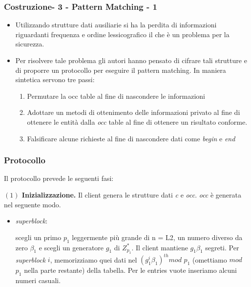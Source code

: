 \documentclass{beamer}
\begin{document}
\begin{frame}
\frametitle{Costruzione- 3 - Pattern Matching - 1}
\begin{itemize}
	\item Utilizzando strutture dati ausiliarie si ha la perdita di informazioni riguardanti frequenza e ordine lessicografico il che è un problema per la sicurezza.\pause
	\item Per risolvere tale problema gli autori hanno pensato di cifrare tali strutture e di proporre un protocollo per eseguire il pattern matching. In maniera sintetica servono tre passi:\pause
	\begin{enumerate}
		\item Permutare la occ table al fine di nascondere le informazioni
		\item Adottare un metodi di ottenimento delle informazioni privato al fine di ottenere le entità dalla \textit{occ} table al fine di ottenere un risultato conforme.\pause
		\item Falsificare alcune richieste al fine di nascondere dati come \textit{begin} e \textit{end}\pause
		
	\end{enumerate}	 
\end{itemize}
\end{frame}
\begin{frame}
\frametitle{Protocollo}
Il protocollo prevede le seguenti fasi:

\textbf{$(1)$ Inizializzazione.} Il client genera le strutture dati \textit{c} e \textit{occ}. \textit{occ} è generata nel seguente modo.

\begin{itemize}
	\item \textit{superblock}:
	
	scegli un primo $ p_{1} $ leggermente più grande
	di n = L2, un numero diverso da zero $ \beta_{1} $ e scegli un generatore
	$g_{1}$ di $ Z^{*}_{p_{1}} $. Il client mantiene $ g_{1} \beta_{1} $ segreti. Per \textit{superblock} $ i $, memorizziamo quei dati nel $ (g^{i}_{1}\beta_{1})^{th} mod$ $p_{1}$
	(omettiamo $mod$ $ p_{1}$ nella parte restante) della tabella.
	Per le entries vuote inseriamo alcuni numeri casuali.
\end{itemize}
\end{frame}
\end{document}
